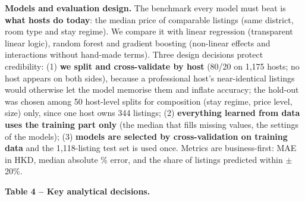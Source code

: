 \documentclass[10pt,a4paper]{article}
\begin{document}
{\textbf{Models and evaluation design.} The benchmark every model must beat is \textbf{what hosts do today}: the median price of comparable listings (same district, room type and stay regime). We compare it with linear regression (transparent linear logic), random forest and gradient boosting (non-linear effects and interactions without hand-made terms). Three design decisions protect credibility: (1) \textbf{we split and cross-validate by host} (80/20 on 1,175 hosts; no host appears on both sides), because a professional host's near-identical listings would otherwise let the model memorise them and inflate accuracy; the hold-out was chosen among 50 host-level splits for composition (stay regime, price level, size) only, since one host owns 344 listings; (2) \textbf{everything learned from data uses the training part only} (the median that fills missing values, the settings of the models); (3) \textbf{models are selected by cross-validation on training data} and the 1,118-listing test set is used once. Metrics are business-first: MAE in HKD, median absolute \% error, and the share of listings predicted within $\pm$20\%.\par}
{\fontsize{8.5}{10.2}\selectfont \raggedright \textbf{Table 4 -- Key analytical decisions.}\par}\vspace{-3.5pt}\nopagebreak[4]
\end{document}
